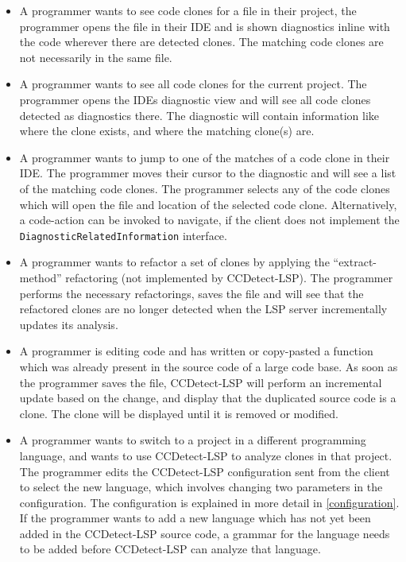 \begin{itemize} 

    \item A programmer wants to see code clones for a file in their project, the
        programmer opens the file in their IDE and is shown diagnostics inline with the
        code wherever there are detected clones. The matching code clones are not
        necessarily in the same file.

	\item A programmer wants to see all code clones for the current project. The
	      programmer opens the IDEs diagnostic view and will see all code clones detected
	      as diagnostics there. The diagnostic will contain information like where the clone
	      exists, and where the matching clone(s) are.

    \item A programmer wants to jump to one of the matches of a code clone in their IDE.
        The programmer moves their cursor to the diagnostic and will see a list of the
        matching code clones. The programmer selects any of the code clones which will
        open the file and location of the selected code clone. Alternatively, a
        code-action can be invoked to navigate, if the client does not implement the
        \verb|DiagnosticRelatedInformation| interface.

      \item A programmer wants to refactor a set of clones by applying the
          ``extract-method'' refactoring (not implemented by CCDetect-LSP). The programmer
          performs the necessary refactorings, saves the file and will see that the
          refactored clones are no longer detected when the LSP server incrementally
          updates its analysis.

      \item A programmer is editing code and has written or copy-pasted a function which
          was already present in the source code of a large code base. As soon as the
          programmer saves the file, CCDetect-LSP will perform an incremental update based
          on the change, and display that the duplicated source code is a clone. The clone
          will be displayed until it is removed or modified.

      \item A programmer wants to switch to a project in a different programming language,
          and wants to use CCDetect-LSP to analyze clones in that project. The programmer
          edits the CCDetect-LSP configuration sent from the client to select the new
          language, which involves changing two parameters in the configuration. The
          configuration is explained in more detail in \cref{configuration}. If the
          programmer wants to add a new language which has not yet been added in the
          CCDetect-LSP source code, a grammar for the language needs to be added before
          CCDetect-LSP can analyze that language.


\end{itemize}
